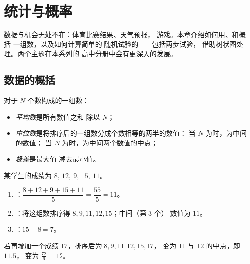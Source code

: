 \chapter{统计与概率}\label{ch:g9:statproba}

数据与机会无处不在：体育比赛结果、天气预报，
游戏。本章介绍如何用、和概括
一组数，以及如何计算简单的
随机试验的——包括两步试验，
借助树状图处理。两个主题在本系列的
高中分册中会有更深入的发展。

\section{数据的概括}

\begin{definition}\label{def:g9:statproba:indicators}
对于 $N$ 个数构成的一组数：
\begin{itemize}
  \item \emph{平均数}是所有数值之和
        除以 $N$；
  \item \emph{中位数}是将排序后的一组数分成个数相等的两半的数值：
        当 $N$ 为时，为中间的数值；
        当 $N$ 为时，为中间两个数值的中点；
  \item \emph{极差}是最大值
        减去最小值。
\end{itemize}
\end{definition}

\begin{example}\label{ex:g9:statproba:indicators}
某学生的成绩为 $8,\ 12,\ 9,\ 15,\ 11$。
\begin{enumerate}
  \item {}：$\dfrac{8 + 12 + 9 + 15 + 11}{5} = \dfrac{55}{5} = 11$。
  \item {}：将这组数排序得 $8, 9, 11, 12, 15$；中间（第 3 个）
        数值为 $11$。
  \item {}：$15 - 8 = 7$。
\end{enumerate}
若再增加一个成绩 $17$，排序后为 $8, 9, 11, 12, 15, 17$，
变为 $11$ 与 $12$ 的中点，即 $11.5$，
变为 $\frac{72}{6} = 12$。
\end{example}

